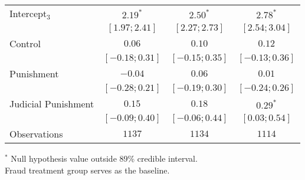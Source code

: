 \begin{table}[h]
\begin{center}
\begin{threeparttable}
\begin{tabular}{l c c c}
Intercept$_3$       & $2.19^{*}$        & $2.50^{*}$        & $2.78^{*}$        \\
                    & $ [ 1.97;  2.41]$ & $ [ 2.27;  2.73]$ & $ [ 2.54;  3.04]$ \\
Control             & $0.06$            & $0.10$            & $0.12$            \\
                    & $ [-0.18;  0.31]$ & $ [-0.15;  0.35]$ & $ [-0.13;  0.36]$ \\
Punishment          & $-0.04$           & $0.06$            & $0.01$            \\
                    & $ [-0.28;  0.21]$ & $ [-0.19;  0.30]$ & $ [-0.24;  0.26]$ \\
Judicial Punishment & $0.15$            & $0.18$            & $0.29^{*}$        \\
                    & $ [-0.09;  0.40]$ & $ [-0.06;  0.44]$ & $ [ 0.03;  0.54]$ \\
\hline
Observations        & $1137$            & $1134$            & $1114$            \\
\hline
\end{tabular}
\begin{tablenotes}[flushleft]
\scriptsize{$^*$ Null hypothesis value outside 89\% credible interval.  \\
Fraud treatment group serves as the baseline.}
\end{tablenotes}
\end{threeparttable}
\label{table:ol_main_ru_npol_1223}
\end{center}
\end{table}
